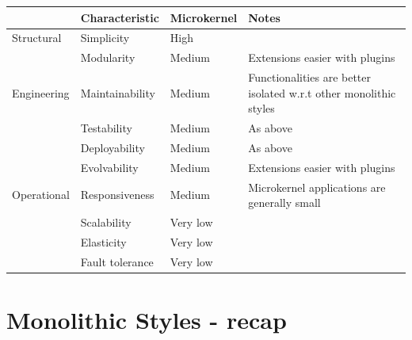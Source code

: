 \begin{table}[h!]
  \renewcommand{\arraystretch}{1.4}
  \centering
  \begin{tabular}{l l l l}
    \toprule
                & \textbf{Characteristic} & \textbf{Microkernel} & \textbf{Notes}                                                    \\
    \midrule
    Structural  & Simplicity              & High                 &                                                                   \\
                & Modularity              & Medium               & Extensions easier with plugins                                    \\
    \midrule
    Engineering & Maintainability         & Medium               & Functionalities are better isolated w.r.t other monolithic styles \\
                & Testability             & Medium               & As above                                                          \\
                & Deployability           & Medium               & As above                                                          \\
                & Evolvability            & Medium               & Extensions easier with plugins                                    \\
    \midrule
    Operational & Responsiveness          & Medium               & Microkernel applications are generally small                      \\
                & Scalability             & Very low             &                                                                   \\
                & Elasticity              & Very low             &                                                                   \\
                & Fault tolerance         & Very low             &                                                                   \\
    \bottomrule
  \end{tabular}
\end{table}

\section{Monolithic Styles - recap}

